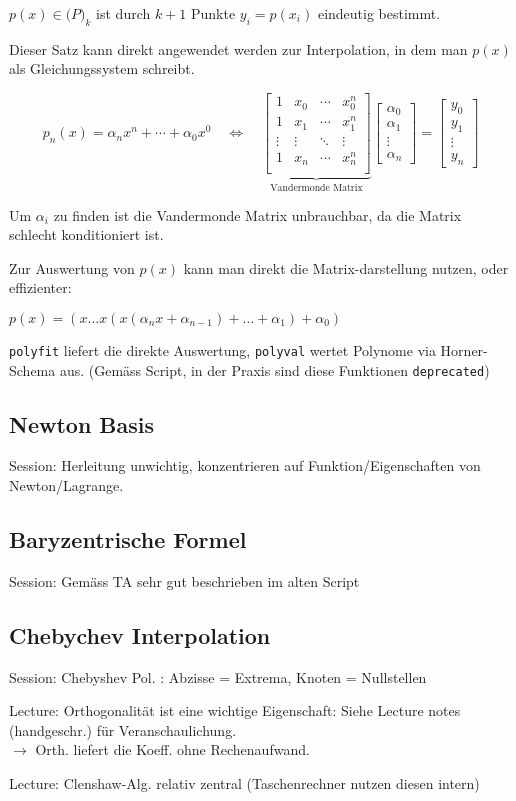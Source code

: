  $p(x) \in \mathcal(P)_k$ ist durch $k+1$ Punkte $y_i = p(x_i)$ eindeutig bestimmt.

Dieser Satz kann direkt angewendet werden zur Interpolation, in dem man $p(x)$ als Gleichungssystem schreibt.

$$
p_n(x) = \alpha_n x^n + \cdots + \alpha_0 x^0 \quad \iff \quad 
\underbrace{
    \begin{bmatrix}
    1 & x_0 & \cdots & x_0^n \\
    1 & x_1 & \cdots & x_1^n \\
    \vdots  & \vdots & \ddots & \vdots \\
    1 & x_n & \cdots & x_n^n \\
    \end{bmatrix}
}_\text{Vandermonde Matrix}
\begin{bmatrix}
    \alpha_0 \\
    \alpha_1 \\
    \vdots   \\
    \alpha_n
\end{bmatrix}
=
\begin{bmatrix}
    y_0 \\
    y_1 \\
    \vdots \\
    y_n
\end{bmatrix}
$$

Um $\alpha_i$ zu finden ist die Vandermonde Matrix unbrauchbar, da die Matrix schlecht konditioniert ist.

Zur Auswertung von $p(x)$ kann man direkt die Matrix-darstellung nutzen, oder effizienter:

 $p(x) = (x \ldots x ( x (\alpha_n x + \alpha_{n-1}) + \ldots + \alpha_1) + \alpha_0)$

 \verb|polyfit| liefert die direkte Auswertung, \verb|polyval| wertet Polynome via Horner-Schema aus. (Gemäss Script, in der Praxis sind diese Funktionen \verb|deprecated|)

\subsection{Newton Basis}
Session: Herleitung unwichtig, konzentrieren auf Funktion/Eigenschaften von Newton/Lagrange.

\subsection{Baryzentrische Formel}
Session: Gemäss TA sehr gut beschrieben im alten Script

\subsection{Chebychev Interpolation}

Session: Chebyshev Pol. : Abzisse = Extrema, Knoten = Nullstellen

Lecture: Orthogonalität ist eine wichtige Eigenschaft: Siehe Lecture notes (handgeschr.) für Veranschaulichung. \\
$\rightarrow$ Orth. liefert die Koeff. ohne Rechenaufwand.

Lecture: Clenshaw-Alg. relativ zentral (Taschenrechner nutzen diesen intern)